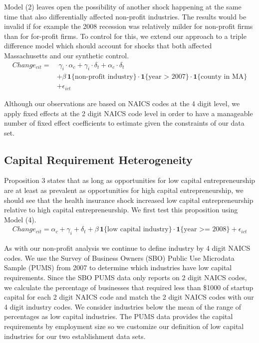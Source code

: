 \documentclass[12pt]{article}
\begin{document}
Model (2) leaves open the possibility of another shock happening at the same time that also differentially affected non-profit industries. The results would be invalid if for example the 2008 recession was relatively milder for non-profit firms than for for-profit firms. To control for this, we extend our approach to a triple difference model which should account for shocks that both affected Massachusetts and our synthetic control. 
\begin{align}
Change_{cit} = & \; \gamma_i \cdot \alpha_c + \gamma_i \cdot \delta_t +  \alpha_c \cdot \delta_t \nonumber   \\
& + \beta \, \mathbf{1}\{\text{non-profit industry}\} \cdot \mathbf{1}\{\text{year > 2007}\}  \cdot \mathbf{1}\{\text{county in  MA}\} \nonumber  \\
& + \epsilon_{ict}
\end{align}

Although our observations are based on NAICS codes at the 4 digit level, we apply fixed effects at the 2 digit NAICS code level in order to have a manageable number of fixed effect coefficients to estimate given the constraints of our data set. 

\subsection{Capital Requirement Heterogeneity}

Proposition 3 states that as long as opportunities for low capital entrepreneurship are at least as prevalent as opportunities for high capital entrepreneurship, we should see that the health insurance shock increased low capital entrepreneurship relative to high capital entrepreneurship. We first test this proposition using Model (4). 
\begin{align}
Change_{cit} =  \alpha_c + \gamma_i+ \delta_t + \beta \, \mathbf{1}\{\text{low capital industry}\} \cdot \mathbf{1}\{\text{year >= 2008}\} + \epsilon_{ict}
\end{align}

As with our non-profit analysis we continue to define industry by 4 digit NAICS codes. We use the Survey of Business Owners (SBO) Public Use Microdata Sample (PUMS) from 2007 to determine which industries have low capital requirements. Since the SBO PUMS data only reports on 2 digit NAICS codes, we calculate the percentage of businesses that required less than \$1000 of startup capital for each 2 digit NAICS code and match the 2 digit NAICS codes with our 4 digit industry codes. We consider industries below the mean of the range of percentages as low capital industries. The PUMS data provides the capital requirements by employment size so we customize our definition of low capital industries for our two establishment data sets. 
\end{document}
